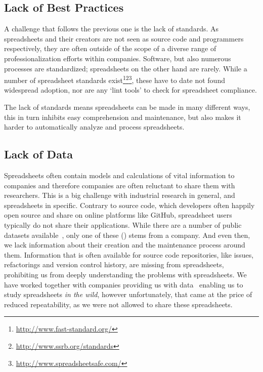 \documentclass[conference]{IEEEtran}
\begin{document}
\subsection{Lack of Best Practices}
A challenge that follows the previous one is the lack of standards. As spreadsheets and their creators are not seen as source code and programmers respectively, they are often outside of the scope of a diverse range of professionalization efforts within companies. Software, but also numerous processes are standardized; spreadsheets on the other hand are rarely. While a number of spreadsheet standards exist\footnote{\url{http://www.fast-standard.org/}}\footnote{\url{http://www.ssrb.org/standards}}\footnote{\url{http://www.spreadsheetsafe.com/}}, these have to date not found widespread adoption, nor are any `lint tools' to check for spreadsheet compliance. 

The lack of standards means spreadsheets can be made in many different ways, this in turn inhibits easy comprehension and maintenance, but also makes it harder to automatically analyze and process spreadsheets.

\subsection{Lack of Data}
Spreadsheets often contain models and calculations of vital information to companies and therefore companies are often reluctant to share them with researchers. This is a big challenge with industrial research in general, and spreadsheets in specific. Contrary to source code, which developers often happily open source and share on online platforms like GitHub, spreadsheet users typically do not share their applications. While there are a number of public datasets available~\cite{fisher_euses_2005, Hermans2015, conf/msr/BarikLSSM15}, only one of these (\cite{Hermans2015}) stems from a company. And even then, we lack information about their creation and the maintenance process around them. Information that is often available for source code repositories, like issues, refactorings and version control history, are missing from spreadsheets, prohibiting us from deeply understanding the problems with spreadsheets. We have worked together with companies providing us with data~\cite{hermans_supporting_2011, hermans_detecting_2012, hermans_detecting_2012-1, hermans_detecting_2014, Jansen2015} enabling us to study spreadsheets \emph{in the wild}, however unfortunately, that came at the price of reduced repeatability, as we were not allowed to share these spreadsheets.
\end{document}

